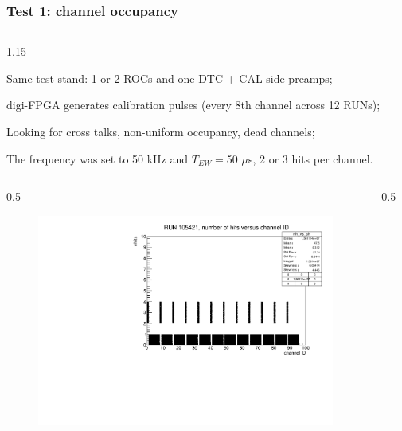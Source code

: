 \documentclass{beamer}
\begin{document}
\begin{frame}
    \frametitle{Test 1: channel occupancy}
\vspace{-3mm}
\begin{columns}
\begin{column}{1.15\framewidth}
    \setlength{\leftmargini}{1.1em}
 \begin{itemize}
 {\small
     \item Same test stand: 1 or 2 ROCs and one DTC + CAL side preamps;
     \item  digi-FPGA generates calibration pulses (every 8th channel across 12 RUNs);
     \item Looking for cross talks, non-uniform occupancy, dead channels;
          \item The frequency was set to 50 kHz and  $T_{EW}=$50 $\mu$s, 2 or 3 hits per channel.
   }
 \end{itemize}
 \end{column}
  \end{columns}
    \vspace{-2mm}
   \begin{columns}
 \begin{column}{0.5\framewidth}
     \begin{figure}[!h]
      \centering
      \includegraphics[width=\columnwidth]{figures/pdf/run105421_nh_vs_ch.pdf}
     \label{fig:normalhits}
\end{figure}
 \begin{itemize}
 \end{itemize}
 \end{column}
  \begin{column}{0.5\framewidth}
     \begin{figure}[!h]

\end{figure}
\end{column}
\end{columns}
\end{frame}
\end{document}
